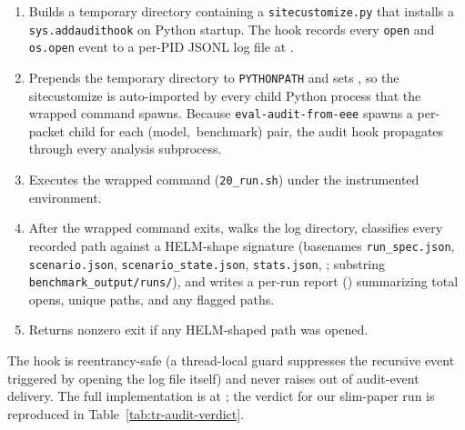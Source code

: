 \documentclass[11pt]{article}
\begin{document}
\begin{enumerate}
  \item Builds a temporary directory containing a
        \texttt{sitecustomize.py} that installs a
        \texttt{sys.addaudithook} on Python startup.
        The hook records every \texttt{open} and \texttt{os.open}
        event to a per-PID JSONL log file at
        .
  \item Prepends the temporary directory to \texttt{PYTHONPATH} and
        sets , so the
        sitecustomize is auto-imported by every child Python process
        that the wrapped command spawns.
        Because \texttt{eval-audit-from-eee} spawns a per-packet
         child for
        each \mbox{(model, benchmark)} pair, the audit hook propagates
        through every analysis subprocess.
  \item Executes the wrapped command (\texttt{20\_run.sh}) under the
        instrumented environment.
  \item After the wrapped command exits, walks the log directory,
        classifies every recorded path against a HELM-shape signature
        (basenames \texttt{run\_spec.json},
        \texttt{scenario.json}, \texttt{scenario\_state.json},
        \texttt{stats.json}, ;
        substring \texttt{benchmark\_output/runs/}), and writes a
        per-run report
        () summarizing
        total opens, unique paths, and any flagged paths.
  \item Returns nonzero exit if any HELM-shaped path was opened.
\end{enumerate}

The hook is reentrancy-safe (a thread-local guard suppresses the
  recursive event triggered by opening the log file itself) and
  never raises out of audit-event delivery.
The full implementation is at
  ; the verdict for our
  slim-paper run is reproduced in
  Table~\ref{tab:tr-audit-verdict}.
\end{document}
